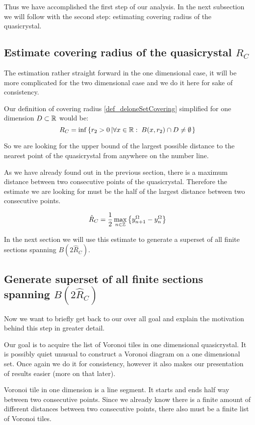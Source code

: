 \documentclass[text.tex]{subfiles}
\begin{document}
Thus we have accomplished the first step of our analysis. In the next subsection we will follow with the second step: estimating covering radius of the quasicrystal. 


\subsection{Estimate covering radius of the quasicrystal $R_C$}
The estimation rather straight forward in the one dimensional case, it will be more complicated for the two dimensional case and we do it here for sake of consistency. 

Our definition of covering radius \ref{def_deloneSetCovering} simplified for one dimension $D\subset\mathbb{R}$ would be: 
$$R_C = \inf\left\{ r_2>0\left| \forall x\in\mathbb{R}:\; B(x,r_2)\cap D \neq \emptyset \right. \right\}$$

So we are looking for the upper bound of the largest possible distance to the nearest point of the quasicrystal from anywhere on the number line. 

As we have already found out in the previous section, there is a maximum distance between two consecutive points of the quasicrystal. Therefore the estimate we are looking for must be the half of the largest distance between two consecutive points. 

$$\hat{R}_C = \frac{1}{2}\max_{n\in\mathbb{Z}}\big\{y^\Omega_{n+1}-y^\Omega_n\big\}$$

In the next section we will use this estimate to generate a superset of all finite sections spanning $B(2\hat{R}_C)$. 

\subsection{Generate superset of all finite sections spanning $B(2\hat{R}_C)$}
Now we want to briefly get back to our over all goal and explain the motivation behind this step in greater detail. 

Our goal is to acquire the list of Voronoi tiles in one dimensional quasicrystal. It is possibly quiet unusual to construct a Voronoi diagram on a one dimensional set. Once again we do it for consistency, however it also makes our presentation of results easier (more on that later). 

Voronoi tile in one dimension is a line segment. It starts and ends half way between two consecutive points. Since we already know there is a finite amount of different distances between two consecutive points, there also must be a finite list of Voronoi tiles. 
\end{document}
